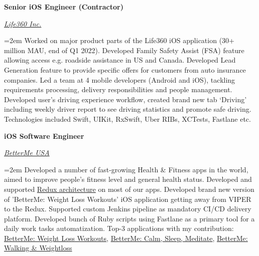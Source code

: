 \documentclass[12pt]{article}
\newcommand{\experience}[4]{%
    \noindent \textbf{#1}
    \hfill \text{#2} \par
    \noindent \textit{#3} \par
    \noindent\hangindent=2em\hangafter=0 \small #4 
    \normalsize \par
}
\begin{document}
\experience
{Senior iOS Engineer (Contractor)}
{2020/01 -- 2022/04}
{\href{https://www.life360.com}{Life360 Inc.}}
{
    Worked on major product parts of the Life360 iOS application (30+ million MAU, end of Q1 2022). 
    Developed Family Safety Assist (FSA) feature allowing access e.g. roadside assistance in US and Canada. 
    Developed Lead Generation feature to provide specific offers for customers from auto insurance companies. 
    Led a team at 4 mobile developers (Android and iOS), tackling requirements processing, delivery responsibilities and people management. 
    Developed user's driving experience workflow, created brand new tab ‘Driving’ including weekly driver report to see driving statistics and promote safe driving.
    \newline \noindent Technologies included Swift, UIKit, RxSwift, Uber RIBs, XCTests, Fastlane etc.
}

\experience
{iOS Software Engineer}
{Nov 2018 -- Dec 2019}
{\href{https://betterme.world/about}{BetterMe USA}}
{
    Developed a number of fast-growing Health \& Fitness apps in the world, aimed to improve people’s fitness level and general health status. 
    Developed and supported \href{https://www.raywenderlich.com/books/advanced-ios-app-architecture/v3.0/chapters/6-architecture-redux}{Redux architecture} on most of our apps. 
    Developed brand new version of 'BetterMe: Weight Loss Workouts' iOS application getting away from VIPER to the Redux. 
    Supported custom Jenkins pipeline as mandatory CI/CD delivery platform. 
    Developed bunch of Ruby scripts using Fastlane as a primary tool for a daily work tasks automatization.
    \newline Top-3 applications with my contribution: 
    \href{https://apps.apple.com/us/app/betterme-weight-loss-workouts/id1264546236}{BetterMe: Weight Loss Workouts}, 
    \href{https://apps.apple.com/us/app/betterme-calm-sleep-meditate/id1363010081}{BetterMe: Calm, Sleep, Meditate}, 
    \href{https://apps.apple.com/us/app/betterme-walking-weightloss/id1434400695}{BetterMe: Walking \& Weightloss}
}
\end{document}
